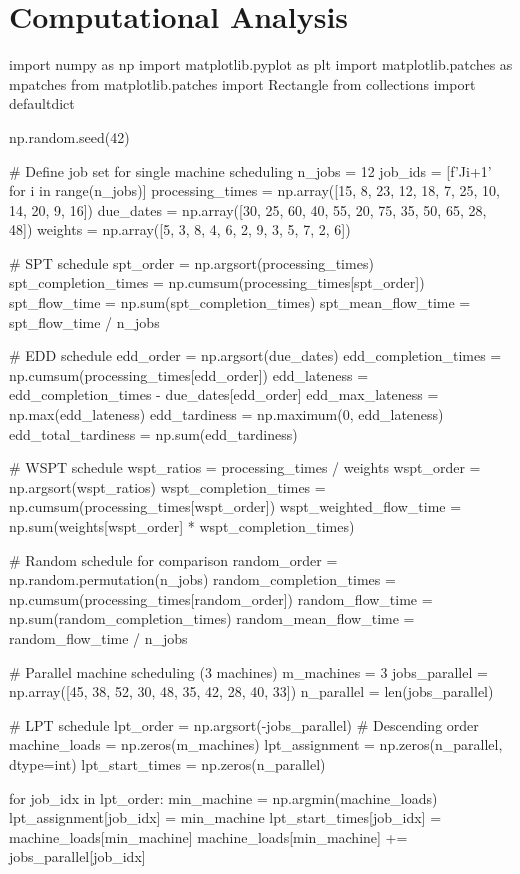 \documentclass[a4paper, 11pt]{article}
\begin{document}
\section{Computational Analysis}

\begin{pycode}
import numpy as np
import matplotlib.pyplot as plt
import matplotlib.patches as mpatches
from matplotlib.patches import Rectangle
from collections import defaultdict

np.random.seed(42)

# Define job set for single machine scheduling
n_jobs = 12
job_ids = [f'J{i+1}' for i in range(n_jobs)]
processing_times = np.array([15, 8, 23, 12, 18, 7, 25, 10, 14, 20, 9, 16])
due_dates = np.array([30, 25, 60, 40, 55, 20, 75, 35, 50, 65, 28, 48])
weights = np.array([5, 3, 8, 4, 6, 2, 9, 3, 5, 7, 2, 6])

# SPT schedule
spt_order = np.argsort(processing_times)
spt_completion_times = np.cumsum(processing_times[spt_order])
spt_flow_time = np.sum(spt_completion_times)
spt_mean_flow_time = spt_flow_time / n_jobs

# EDD schedule
edd_order = np.argsort(due_dates)
edd_completion_times = np.cumsum(processing_times[edd_order])
edd_lateness = edd_completion_times - due_dates[edd_order]
edd_max_lateness = np.max(edd_lateness)
edd_tardiness = np.maximum(0, edd_lateness)
edd_total_tardiness = np.sum(edd_tardiness)

# WSPT schedule
wspt_ratios = processing_times / weights
wspt_order = np.argsort(wspt_ratios)
wspt_completion_times = np.cumsum(processing_times[wspt_order])
wspt_weighted_flow_time = np.sum(weights[wspt_order] * wspt_completion_times)

# Random schedule for comparison
random_order = np.random.permutation(n_jobs)
random_completion_times = np.cumsum(processing_times[random_order])
random_flow_time = np.sum(random_completion_times)
random_mean_flow_time = random_flow_time / n_jobs

# Parallel machine scheduling (3 machines)
m_machines = 3
jobs_parallel = np.array([45, 38, 52, 30, 48, 35, 42, 28, 40, 33])
n_parallel = len(jobs_parallel)

# LPT schedule
lpt_order = np.argsort(-jobs_parallel)  # Descending order
machine_loads = np.zeros(m_machines)
lpt_assignment = np.zeros(n_parallel, dtype=int)
lpt_start_times = np.zeros(n_parallel)

for job_idx in lpt_order:
    min_machine = np.argmin(machine_loads)
    lpt_assignment[job_idx] = min_machine
    lpt_start_times[job_idx] = machine_loads[min_machine]
    machine_loads[min_machine] += jobs_parallel[job_idx]


\end{pycode}
\end{document}
